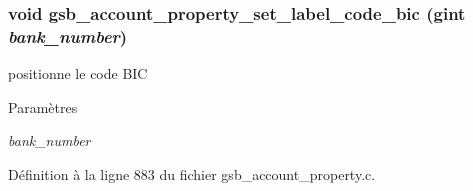 \subsubsection[{gsb\_\-account\_\-property\_\-set\_\-label\_\-code\_\-bic}]{\setlength{\rightskip}{0pt plus 5cm}void gsb\_\-account\_\-property\_\-set\_\-label\_\-code\_\-bic (gint {\em bank\_\-number})}\label{gsb__account__property_8h_a5375ffa889697cfd87407d2552481517}
positionne le code BIC


\begin{DoxyParams}{Paramètres}
\item[{\em bank\_\-number}]\end{DoxyParams}


Définition à la ligne 883 du fichier gsb\_\-account\_\-property.c.

